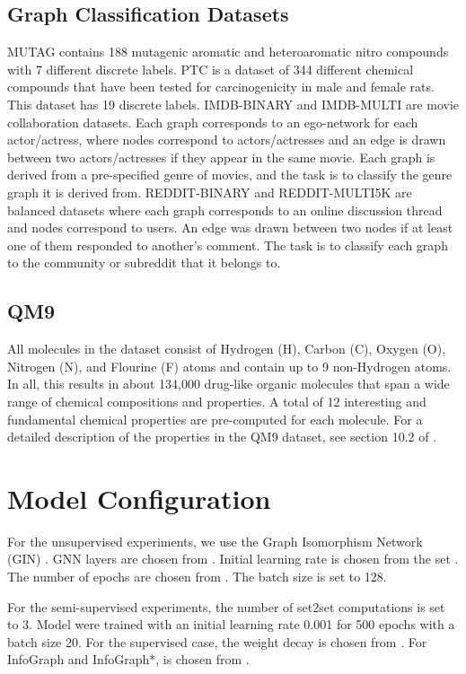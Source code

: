 \documentclass{article} \usepackage{iclr2020_conference,times}
\def\method{InfoGraph}
\begin{document}
\subsection{Graph Classification Datasets}
MUTAG contains 188 mutagenic aromatic and heteroaromatic nitro compounds with 7 different discrete labels. 
PTC is a dataset of 344 different chemical compounds that have been tested for carcinogenicity in male and female rats. This dataset has 19 discrete labels. IMDB-BINARY and IMDB-MULTI are movie collaboration datasets. Each graph corresponds to an ego-network for each actor/actress, where nodes correspond to actors/actresses and an edge is drawn between two actors/actresses if they appear in the same movie. Each graph is derived from a pre-specified genre of movies, and the task is to classify the genre graph it is derived from. REDDIT-BINARY and REDDIT-MULTI5K are balanced datasets where each graph corresponds to an online discussion thread and nodes correspond to users. An edge was drawn between two nodes if at least one of them responded to another’s comment. The task is to classify each graph to the community or subreddit that it belongs to.

\subsection{QM9}
All molecules in the dataset consist of Hydrogen (H), Carbon (C), Oxygen (O), Nitrogen (N), and Flourine (F) atoms and contain up to 9 non-Hydrogen atoms. In all, this results in about 134,000 drug-like organic molecules that span a wide range of chemical compositions and properties. A total of 12 interesting and fundamental chemical properties are pre-computed for each molecule. For a detailed description of the properties in the QM9 dataset, see section 10.2 of \cite{gilmer2017neural}.


\section{Model Configuration}
For the unsupervised experiments, we use the Graph Isomorphism Network (GIN) \cite{xu2018powerful}. GNN layers are chosen from . Initial learning rate is chosen from the set . The number of epochs are chosen from . The batch size is set to 128.

For the semi-supervised experiments, the number of set2set computations is set to 3. Model were trained with an initial learning rate 0.001 for 500 epochs with a batch size 20. For the supervised case, the weight decay is chosen from . For \method{} and \method{}*,  is chosen from .
\end{document}
